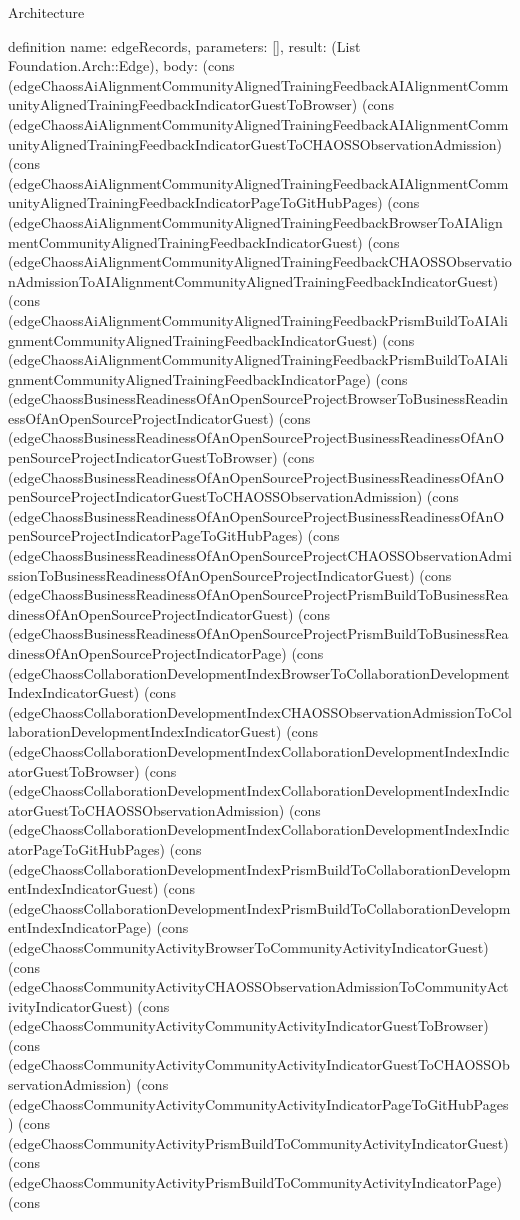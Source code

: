 \begin{lexlean}{Architecture}
\begin{semanticmodule}
definition{
  name: edgeRecords,
  parameters: [],
  result: (List Foundation.Arch::Edge),
  body: (cons (edgeChaossAiAlignmentCommunityAlignedTrainingFeedbackAIAlignmentCommunityAlignedTrainingFeedbackIndicatorGuestToBrowser) (cons (edgeChaossAiAlignmentCommunityAlignedTrainingFeedbackAIAlignmentCommunityAlignedTrainingFeedbackIndicatorGuestToCHAOSSObservationAdmission) (cons (edgeChaossAiAlignmentCommunityAlignedTrainingFeedbackAIAlignmentCommunityAlignedTrainingFeedbackIndicatorPageToGitHubPages) (cons (edgeChaossAiAlignmentCommunityAlignedTrainingFeedbackBrowserToAIAlignmentCommunityAlignedTrainingFeedbackIndicatorGuest) (cons (edgeChaossAiAlignmentCommunityAlignedTrainingFeedbackCHAOSSObservationAdmissionToAIAlignmentCommunityAlignedTrainingFeedbackIndicatorGuest) (cons (edgeChaossAiAlignmentCommunityAlignedTrainingFeedbackPrismBuildToAIAlignmentCommunityAlignedTrainingFeedbackIndicatorGuest) (cons (edgeChaossAiAlignmentCommunityAlignedTrainingFeedbackPrismBuildToAIAlignmentCommunityAlignedTrainingFeedbackIndicatorPage) (cons (edgeChaossBusinessReadinessOfAnOpenSourceProjectBrowserToBusinessReadinessOfAnOpenSourceProjectIndicatorGuest) (cons (edgeChaossBusinessReadinessOfAnOpenSourceProjectBusinessReadinessOfAnOpenSourceProjectIndicatorGuestToBrowser) (cons (edgeChaossBusinessReadinessOfAnOpenSourceProjectBusinessReadinessOfAnOpenSourceProjectIndicatorGuestToCHAOSSObservationAdmission) (cons (edgeChaossBusinessReadinessOfAnOpenSourceProjectBusinessReadinessOfAnOpenSourceProjectIndicatorPageToGitHubPages) (cons (edgeChaossBusinessReadinessOfAnOpenSourceProjectCHAOSSObservationAdmissionToBusinessReadinessOfAnOpenSourceProjectIndicatorGuest) (cons (edgeChaossBusinessReadinessOfAnOpenSourceProjectPrismBuildToBusinessReadinessOfAnOpenSourceProjectIndicatorGuest) (cons (edgeChaossBusinessReadinessOfAnOpenSourceProjectPrismBuildToBusinessReadinessOfAnOpenSourceProjectIndicatorPage) (cons (edgeChaossCollaborationDevelopmentIndexBrowserToCollaborationDevelopmentIndexIndicatorGuest) (cons (edgeChaossCollaborationDevelopmentIndexCHAOSSObservationAdmissionToCollaborationDevelopmentIndexIndicatorGuest) (cons (edgeChaossCollaborationDevelopmentIndexCollaborationDevelopmentIndexIndicatorGuestToBrowser) (cons (edgeChaossCollaborationDevelopmentIndexCollaborationDevelopmentIndexIndicatorGuestToCHAOSSObservationAdmission) (cons (edgeChaossCollaborationDevelopmentIndexCollaborationDevelopmentIndexIndicatorPageToGitHubPages) (cons (edgeChaossCollaborationDevelopmentIndexPrismBuildToCollaborationDevelopmentIndexIndicatorGuest) (cons (edgeChaossCollaborationDevelopmentIndexPrismBuildToCollaborationDevelopmentIndexIndicatorPage) (cons (edgeChaossCommunityActivityBrowserToCommunityActivityIndicatorGuest) (cons (edgeChaossCommunityActivityCHAOSSObservationAdmissionToCommunityActivityIndicatorGuest) (cons (edgeChaossCommunityActivityCommunityActivityIndicatorGuestToBrowser) (cons (edgeChaossCommunityActivityCommunityActivityIndicatorGuestToCHAOSSObservationAdmission) (cons (edgeChaossCommunityActivityCommunityActivityIndicatorPageToGitHubPages) (cons (edgeChaossCommunityActivityPrismBuildToCommunityActivityIndicatorGuest) (cons (edgeChaossCommunityActivityPrismBuildToCommunityActivityIndicatorPage) (cons }
\end{semanticmodule}
\end{lexlean}
